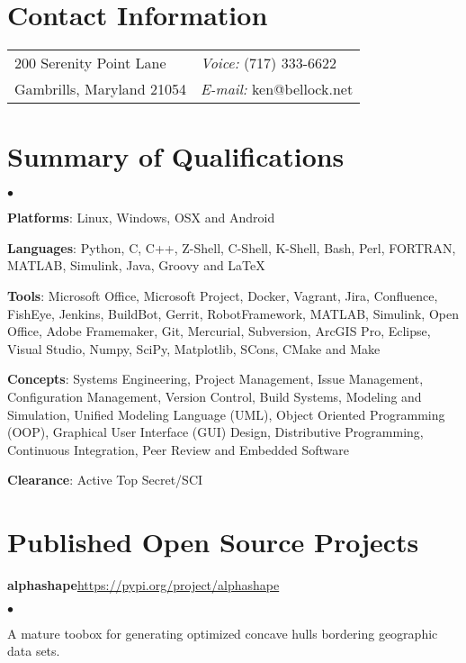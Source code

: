 \documentclass[margin,line]{res}
\newenvironment{list2}{
  \begin{list}{$\bullet$}{%
      \setlength{\itemsep}{0in}
      \setlength{\parsep}{0in} \setlength{\parskip}{0in}
      \setlength{\topsep}{0in} \setlength{\partopsep}{0in} 
      \setlength{\leftmargin}{0.2in}}}{\end{list}}
\begin{document}

\begin{resume}
\section{\sc Contact Information}
\vspace{.05in}
\begin{tabular}{@{}p{4in}p{4in}}
200 Serenity Point Lane   & {\it Voice:}  (717) 333-6622 \\            
Gambrills, Maryland 21054 & {\it E-mail:}  ken@bellock.net\\         
\end{tabular}

\section{\sc Summary of Qualifications} 
\begin{list2}
\item {\bf Platforms}: Linux, Windows, OSX and Android
\item {\bf Languages}: Python, C, C++, Z-Shell, C-Shell, K-Shell, Bash, Perl, FORTRAN, MATLAB, Simulink, Java, Groovy and \LaTeX
\item {\bf Tools}: Microsoft Office, Microsoft Project, Docker, Vagrant, Jira, Confluence, FishEye, Jenkins, BuildBot, Gerrit, RobotFramework, MATLAB, Simulink, Open Office, Adobe Framemaker, Git, Mercurial, Subversion, ArcGIS Pro, Eclipse, Visual Studio, Numpy, SciPy, Matplotlib, SCons, CMake and Make
\item {\bf Concepts}: Systems Engineering, Project Management, Issue Management, Configuration Management, Version Control, Build Systems, Modeling and Simulation, Unified Modeling Language (UML), Object Oriented Programming (OOP), Graphical User Interface (GUI) Design, Distributive Programming, Continuous Integration, Peer Review and Embedded Software
\item {\bf Clearance}: Active Top Secret/SCI
\end{list2}

\section{\sc Published Open Source Projects}
{\bf alphashape}\hfill\url{https://pypi.org/project/alphashape}

\begin{list2}
\item A mature toobox for generating optimized concave hulls bordering geographic data sets.
\end{list2}


\end{resume}
\end{document}
